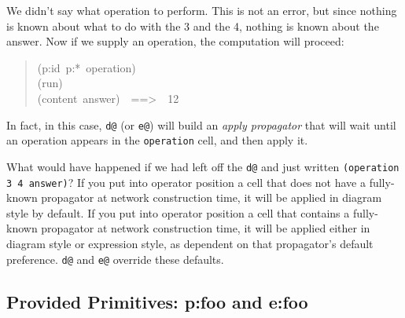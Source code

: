 \documentclass[12pt,letterpaper,english]{article}
\begin{document}
We didn't say what operation to perform.  This is not an error, but
since nothing is known about what to do with the 3 and the 4, nothing
is known about the answer.  Now if we supply an operation, the
computation will proceed:
\begin{quote}{\ttfamily \raggedright \noindent
(p:id~p:*~operation)~\\
(run)~\\
(content~answer)~~==>~~12
}\end{quote}

In fact, in this case, \texttt{d@} (or \texttt{e@}) will build an \emph{apply propagator}
that will wait until an operation appears in the
\texttt{operation} cell, and then apply it.

What would have happened if we had left off the \texttt{d@} and just
written \texttt{(operation 3 4 answer)}?  If you put into operator position
a cell that does not have a fully-known propagator at network
construction time, it will be applied in diagram style by default.  If
you put into operator position a cell that contains a fully-known
propagator at network construction time, it will be applied either in
diagram style or expression style, as dependent on that propagator's
default preference.  \texttt{d@} and \texttt{e@} override these defaults.



\subsection{Provided Primitives: p:foo and e:foo}
\label{provided-primitives-p-foo-and-e-foo}
\end{document}
